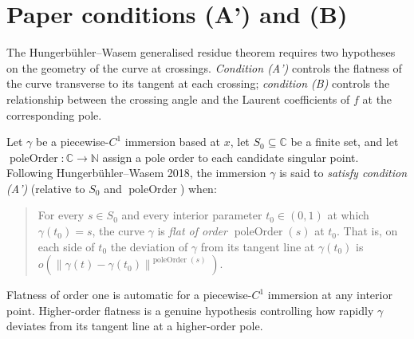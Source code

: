 \section{Paper conditions (A') and (B)}\label{sec:conditions}

The Hungerbühler--Wasem generalised residue theorem requires two
hypotheses on the geometry of the curve at crossings. \emph{Condition
(A')} controls the flatness of the curve transverse to its tangent at
each crossing; \emph{condition (B)} controls the relationship between
the crossing angle and the Laurent coefficients of $f$ at the
corresponding pole.

\begin{definition}[Condition (A')]
  \label{def:condition-a-prime}
  \leanok
  Let $\gamma$ be a piecewise-$C^{1}$ immersion based at $x$, let
  $S_0 \subseteq \mathbb{C}$ be a finite set, and let
  $\operatorname{poleOrder} : \mathbb{C} \to \mathbb{N}$ assign a
  pole order to each candidate singular point. Following
  Hungerbühler--Wasem 2018, the immersion
  $\gamma$ is said to \emph{satisfy condition (A')} (relative to
  $S_0$ and $\operatorname{poleOrder}$) when:

  \begin{quote}
    For every $s \in S_0$ and every interior parameter
    $t_0 \in (0,1)$ at which $\gamma(t_0) = s$, the curve $\gamma$
    is \emph{flat of order $\operatorname{poleOrder}(s)$} at
    $t_0$. That is, on each side of $t_0$ the deviation of
    $\gamma$ from its tangent line at $\gamma(t_0)$ is
    $o(\|\gamma(t) - \gamma(t_0)\|^{\operatorname{poleOrder}(s)})$.
  \end{quote}

  Flatness of order one is automatic for a piecewise-$C^{1}$
  immersion at any interior point. Higher-order flatness is a genuine
  hypothesis controlling how rapidly $\gamma$ deviates from its
  tangent line at a higher-order pole.
\end{definition}

